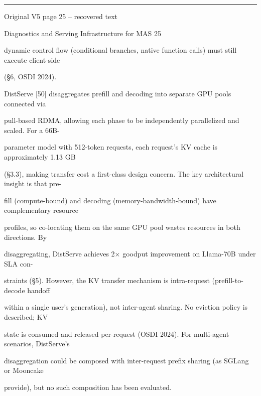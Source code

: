 \par\smallskip\noindent\rule{\textwidth}{0.4pt}\par{\sffamily\footnotesize Original V5 page 25 -- recovered text}\par\begin{flushleft}\footnotesize\ttfamily
\par\smallskip
\par\smallskip
\noindent Diagnostics and Serving Infrastructure for MAS 25\par
\par\smallskip
\par\smallskip
\par\smallskip
\noindent dynamic control flow (conditional branches, native function calls) must still execute client-side\par
\noindent (§6, OSDI 2024).\par
\noindent  DistServe [50] disaggregates prefill and decoding into separate GPU pools connected via\par
\noindent pull-based RDMA, allowing each phase to be independently parallelized and scaled. For a 66B-\par
\noindent parameter model with 512-token requests, each request’s KV cache is approximately 1.13 GB\par
\noindent (§3.3), making transfer cost a first-class design concern. The key architectural insight is that pre-\par
\noindent fill (compute-bound) and decoding (memory-bandwidth-bound) have complementary resource\par
\noindent profiles, so co-locating them on the same GPU pool wastes resources in both directions. By\par
\noindent disaggregating, DistServe achieves 2× goodput improvement on Llama-70B under SLA con-\par
\noindent straints (§5). However, the KV transfer mechanism is intra-request (prefill-to-decode handoff\par
\noindent within a single user’s generation), not inter-agent sharing. No eviction policy is described; KV\par
\noindent state is consumed and released per-request (OSDI 2024). For multi-agent scenarios, DistServe’s\par
\noindent disaggregation could be composed with inter-request prefix sharing (as SGLang or Mooncake\par
\noindent provide), but no such composition has been evaluated.\par

\end{flushleft}
